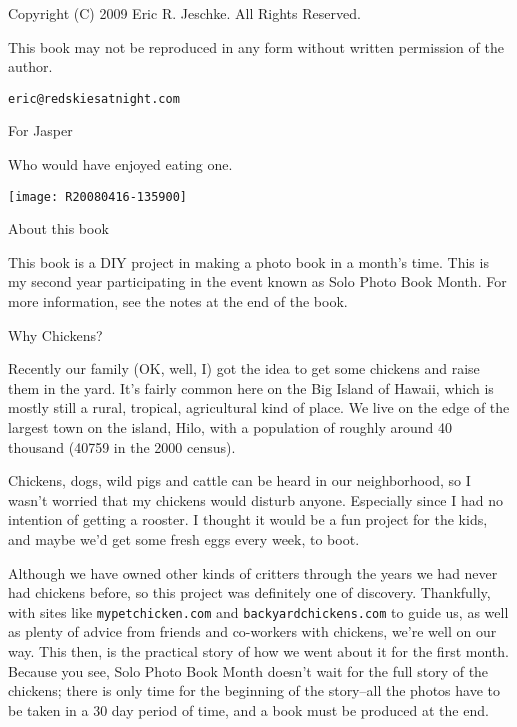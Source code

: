 %
%
% 
%

\vspace*{5in}
{\large Copyright (C) 2009 Eric R. Jeschke.  All Rights Reserved.}

This book may not be reproduced in any form without written permission
of the author. 

{\tt eric@redskiesatnight.com}
\newpage

\vspace*{2in}
\begin{center}
{\LARGE For Jasper}

{\large Who would have enjoyed eating one.}

\vspace*{0.5in}

\texttt{[image: R20080416-135900]}
\end{center}
\newpage

\vspace*{1in}
{\LARGE About this book}

This book is a DIY project in making a photo book in a month's
time. This is my second year participating in the event known as Solo
Photo Book Month. For more information, see the notes at the end of the
book. 

\vspace*{0.25in}

{\LARGE Why Chickens?}

Recently our family (OK, well, I) got the idea to get some chickens and
raise them in the yard. It's fairly common here on the Big Island of
Hawaii, which is mostly still a rural, tropical, agricultural kind of
place. We live on the edge of the largest town on the island, Hilo, with
a population of roughly around 40 thousand (40759 in the 2000 census).

Chickens, dogs, wild pigs and cattle can be heard in our neighborhood,
so I wasn't worried that my chickens would disturb anyone. Especially
since I had no intention of getting a rooster. I thought it would be a
fun project for the kids, and maybe we'd get some fresh eggs every week,
to boot. 

Although we have owned other kinds of critters through the years we had
never had chickens before, so this project was definitely one of
discovery. 
Thankfully, with sites like {\tt mypetchicken.com} and 
{\tt backyardchickens.com} to
guide us, as well as plenty of advice from friends and co-workers with
chickens, we're well on our way. This then, is the practical story of
how we went about it for the first month. Because you see, Solo Photo
Book Month doesn't wait for the full story of the chickens; there is
only time for the beginning of the story--all the photos have to be taken
in a 30 day period of time, and a book must be produced at the end.

